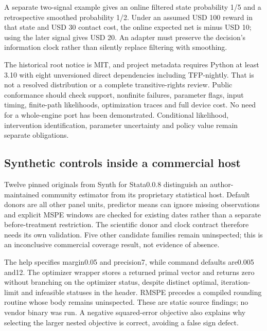 A separate two-signal example gives an online filtered state probability
1/5 and a retrospective smoothed probability 1/2. Under an assumed USD
100 reward in that state and USD 30 contact cost, the online expected
net is minus USD 10; using the later signal gives USD 20. An adapter
must preserve the decision's information clock rather than silently
replace filtering with smoothing. \citep{exec19_dynamax_reference}

The historical root notice is MIT, and project metadata requires Python
at least 3.10 with eight unversioned direct dependencies including
TFP-nightly. That is not a resolved distribution or a complete
transitive-rights review. Public conformance should check support,
nonfinite failures, parameter flags, input timing, finite-path
likelihoods, optimization traces and full device cost. No need for a
whole-engine port has been demonstrated. Conditional likelihood,
intervention identification, parameter uncertainty and policy value
remain separate obligations.\citep{exec19_dynamax_source}

\hypertarget{synthetic-controls-inside-a-commercial-host}{%
\subsection{Synthetic controls inside a commercial
host}\label{synthetic-controls-inside-a-commercial-host}}

Twelve pinned originals from Synth for Stata0.0.8 distinguish an
author-maintained community estimator from its proprietary statistical
host. Default donors are all other panel units, predictor means can
ignore missing observations and explicit MSPE windows are checked for
existing dates rather than a separate before-treatment restriction. The
scientific donor and clock contract therefore needs its own validation.
Five other candidate families remain uninspected; this is an
inconclusive commercial coverage result, not evidence of absence.
\citep{exec19_synth_stata_source}

The help specifies margin0.05 and precision7, while command defaults
are0.005 and12. The optimizer wrapper stores a returned primal vector
and returns zero without branching on the optimizer status, despite
distinct optimal, iteration- limit and infeasible statuses in the
header. RMSPE precedes a compiled rounding routine whose body remains
uninspected. These are static source findings; no vendor binary was run.
A negative squared-error objective also explains why selecting the
larger nested objective is correct, avoiding a false sign defect.
\citep{exec19_synth_stata_source}

